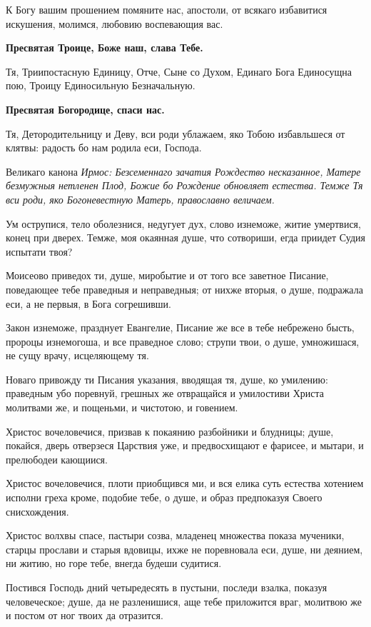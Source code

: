 К Богу вашим прошением помяните нас, апостоли, от всякаго избавитися искушения, молимся, любовию воспевающия вас.


\bfseries Пресвятая Троице, Боже наш, слава Тебе.\normalfont{}

Тя, Триипостасную Единицу, Отче, Сыне со Духом, Единаго Бога Единосущна пою, Троицу Единосильную Безначальную.


\bfseries Пресвятая Богородице, спаси нас.\normalfont{}


Тя, Детородительницу и Деву, вси роди ублажаем, яко Тобою избавльшеся от клятвы: радость бо нам родила еси, Господа.


Великаго канона \itshape Ирмос\normalfont{}: Безсеменнаго зачатия Рождество несказанное, Матере безмужныя нетленен Плод, Божие бо Рождение обновляет естества. Темже Тя вси роди, яко Богоневестную Матерь, православно величаем.


Ум острупися, тело оболезнися, недугует дух, слово изнеможе, житие умертвися, конец при дверех. Темже, моя окаянная душе, что сотвориши, егда приидет Судия испытати твоя?


Моисеово приведох ти, душе, миробытие и от того все заветное Писание, поведающее тебе праведныя и неправедныя; от нихже вторыя, о душе, подражала еси, а не первыя, в Бога согрешивши.


Закон изнеможе, празднует Евангелие, Писание же все в тебе небрежено бысть, пророцы изнемогоша, и все праведное слово; струпи твои, о душе, умножишася, не сущу врачу, исцеляющему тя.


Новаго привожду ти Писания указания, вводящая тя, душе, ко умилению: праведным убо поревнуй, грешных же отвращайся и умилостиви Христа молитвами же, и пощеньми, и чистотою, и говением.


Христос вочеловечися, призвав к покаянию разбойники и блудницы; душе, покайся, дверь отверзеся Царствия уже, и предвосхищают е фарисее, и мытари, и прелюбодеи кающиися.


Христос вочеловечися, плоти приобщився ми, и вся елика суть естества хотением исполни греха кроме, подобие тебе, о душе, и образ предпоказуя Своего снисхождения.


Христос волхвы спасе, пастыри созва, младенец множества показа мученики, старцы прослави и старыя вдовицы, ихже не поревновала еси, душе, ни деянием, ни житию, но горе тебе, внегда будеши судитися.


Постився Господь дний четыредесять в пустыни, последи взалка, показуя человеческое; душе, да не разленишися, аще тебе приложится враг, молитвою же и постом от ног твоих да отразится.


